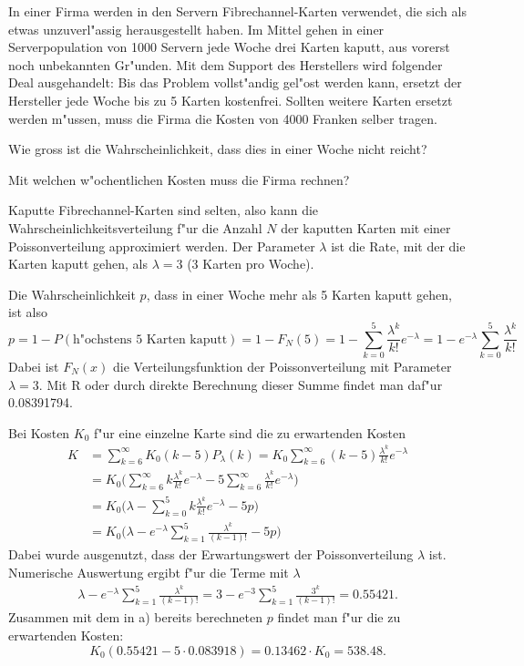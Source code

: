 In einer Firma werden in den Servern Fibrechannel-Karten verwendet,
die sich als etwas unzuverl"assig herausgestellt haben.
Im Mittel gehen in einer Serverpopulation von 1000 Servern jede Woche
drei Karten kaputt, aus vorerst noch unbekannten Gr"unden.
Mit dem Support des Herstellers wird folgender Deal
ausgehandelt: Bis das Problem vollst"andig gel"ost werden kann, 
ersetzt der Hersteller jede Woche bis zu 5 Karten kostenfrei.
Sollten weitere Karten ersetzt werden m"ussen, muss die Firma
die Kosten von 4000 Franken selber tragen.
\begin{teilaufgaben}
\item
Wie gross ist die Wahrscheinlichkeit, dass dies in einer Woche nicht
reicht?
\item
Mit welchen w"ochentlichen Kosten muss die Firma rechnen?
\end{teilaufgaben}

\begin{loesung}
Kaputte Fibrechannel-Karten sind selten, also kann
die Wahrscheinlichkeitsverteilung f"ur die Anzahl $N$ der kaputten Karten
mit einer Poissonverteilung approximiert werden. Der Parameter $\lambda$
ist die Rate, mit der die Karten kaputt gehen, als $\lambda=3$ (3 Karten
pro Woche).
\begin{teilaufgaben}
\item
Die Wahrscheinlichkeit $p$, dass in einer Woche mehr als 5 Karten kaputt
gehen, ist also
\[
p=1-P(\text{h"ochstens 5 Karten kaputt})=1-F_N(5)
=1-\sum_{k=0}^5\frac{\lambda^k}{k!}e^{-\lambda}
=1-e^{-\lambda}\sum_{k=0}^5\frac{\lambda^k}{k!}
\]
Dabei ist $F_N(x)$ die Verteilungsfunktion der Poissonverteilung mit
Parameter $\lambda=3$. Mit R oder durch direkte Berechnung dieser
Summe findet man daf"ur 0.08391794.
\item
Bei Kosten $K_0$ f"ur eine einzelne Karte sind die zu erwartenden Kosten 
\begin{align*}
K
&=
\sum_{k=6}^\infty K_0(k-5)P_\lambda(k)
=
K_0
\sum_{k=6}^\infty (k-5)\frac{\lambda^k}{k!}e^{-\lambda}
\\
&=
K_0\biggl(
\sum_{k=6}^\infty k\frac{\lambda^k}{k!}e^{-\lambda}
-5\sum_{k=6}^\infty \frac{\lambda^k}{k!}e^{-\lambda}
\biggr)
\\
&=
K_0\biggl(
\lambda-\sum_{k=0}^5k\frac{\lambda^k}{k!}e^{-\lambda}
-5p
\biggr)
\\
&=
K_0\biggl(\lambda- e^{-\lambda}\sum_{k=1}^5\frac{\lambda^k}{(k-1)!} -5p\biggr)
\end{align*}
Dabei wurde ausgenutzt, dass der Erwartungswert der Poissonverteilung
$\lambda$ ist.
Numerische Auswertung ergibt f"ur die Terme mit $\lambda$
\begin{align*}
\lambda-e^{-\lambda}\sum_{k=1}^5\frac{\lambda^k}{(k-1)!}
=
3-e^{-3}\sum_{k=1}^5\frac{3^k}{(k-1)!}
=0.55421.
\end{align*}
Zusammen mit dem in a) bereits berechneten $p$ findet man f"ur die
zu erwartenden Kosten:
\[
K_0(0.55421 - 5\cdot 0.083918)=0.13462\cdot K_0 = 538.48.
\]
\end{teilaufgaben}
\end{loesung}
